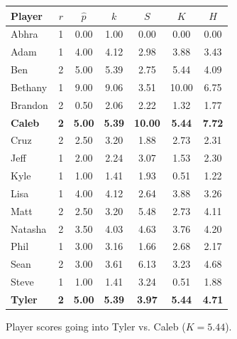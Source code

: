 \documentclass[letterpaper, 10 pt, conference]{ieeeconf}  %
\begin{document}
\begin{figure}
        \centering
        \begin{subfigure}[hb]{0.4\textwidth}
                \footnotesize
                \centering
                \begin{tabular}{lccc|ccc}
                        Player	&	$r$	&	$\hat{p}$	&	$k$	&	$S$	&	$K$	&	$H$	\\
                        \midrule													
                        Abhra	&	1	&	0.00	&	1.00	&	0.00	&	0.00	&	0.00	\\
                        Adam	&	1	&	4.00	&	4.12	&	2.98	&	3.88	&	3.43	\\
                        Ben	&	2	&	5.00	&	5.39	&	2.75	&	5.44	&	4.09	\\
                        Bethany	&	1	&	9.00	&	9.06	&	3.51	&	10.00	&	6.75	\\
                        Brandon	&	2	&	0.50	&	2.06	&	2.22	&	1.32	&	1.77	\\
                        \textbf{Caleb}	&	\textbf{2}	&	\textbf{5.00}	&	\textbf{5.39}	&	\textbf{10.00}	&	\textbf{5.44}	&	\textbf{7.72}	\\
                        Cruz	&	2	&	2.50	&	3.20	&	1.88	&	2.73	&	2.31	\\
                        Jeff	&	1	&	2.00	&	2.24	&	3.07	&	1.53	&	2.30	\\
                        Kyle	&	1	&	1.00	&	1.41	&	1.93	&	0.51	&	1.22	\\
                        Lisa	&	1	&	4.00	&	4.12	&	2.64	&	3.88	&	3.26	\\
                        Matt	&	2	&	2.50	&	3.20	&	5.48	&	2.73	&	4.11	\\
                        Natasha	&	2	&	3.50	&	4.03	&	4.63	&	3.76	&	4.20	\\
                        Phil	&	1	&	3.00	&	3.16	&	1.66	&	2.68	&	2.17	\\
                        Sean	&	2	&	3.00	&	3.61	&	6.13	&	3.23	&	4.68	\\
                        Steve	&	1	&	1.00	&	1.41	&	3.24	&	0.51	&	1.88	\\
                        \textbf{Tyler}	&	\textbf{2}	&	\textbf{5.00}	&	\textbf{5.39}	&	\textbf{3.97}	&	\textbf{5.44}	&	\textbf{4.71}	\\
                \end{tabular}
                \caption{Player scores going into Tyler vs. Caleb ($K=5.44$).}
        \end{subfigure}
        \begin{subfigure}[hb]{0.4\textwidth}

\end{subfigure}
\end{figure}
\end{document}
